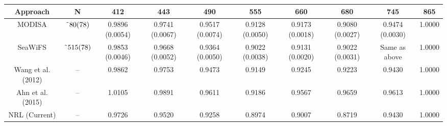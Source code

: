 \documentclass[preview]{standalone}
\begin{document}
\begin{threeparttable}

\centering
\begin{tabular}{cccccccccc} 
 \hline 
Approach & N\tnote{\it a}			  & 412 	 			& 443 	  			& 490    			& 555    			& 660    						& 680    						& 745    			& 865    \\ \hline
MODISA\tnote{\it b}& $\char`\~80(78)$ & 0.9896 (0.0054) 	& 0.9741 (0.0067) & 0.9517 (0.0074) & 0.9128 (0.0050) & 0.9173 (0.0018) 			& 0.9080 (0.0027) &  0.9474 (0.0030) 	& 1.0000 \\%
SeaWiFS\tnote{\it b}& $\char`\~515(78)$ & 0.9853 (0.0046) & 0.9668 (0.0052) & 0.9364 (0.0050) & 0.9022 (0.0038) & 0.9131 (0.0020)\tnote{\it c} & 0.9022 (0.0031)\tnote{\it c} & Same as above 	& 1.0000 \\
Wang et al. (2012)& 	--				& 0.9862 			& 0.9753 			& 0.9473 			& 0.9149 			& 0.9245 & 0.9223 & 0.9430 & 1.0000 \\
Ahn et al. (2015)& 	-- & 1.0105 & 0.9891 & 0.9611 & 0.9186 & 0.9567 & 0.9659 & 0.9613 & 1.0000 \\
NRL (Current) 	& --	& 0.9726 & 0.9520 & 0.9258 & 0.8974 & 0.9007 & 0.8719 & 0.9430 & 1.0000 \\


\end{tabular}
\end{threeparttable}
\end{document}
